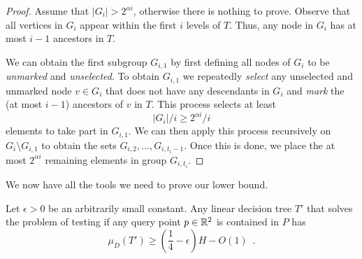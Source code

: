 \documentclass[charterfonts,lotsofwhite]{patmorin}
\begin{document}
\begin{proof}
Assume that $|G_i|> 2^{\alpha i}$, otherwise there is nothing to
prove.  Observe that all vertices in $G_i$ appear within the first $i$
levels of $T$.  Thus, any node in $G_i$ has at most $i-1$ ancestors in
$T$.  

We can obtain the first subgroup $G_{i,1}$ by first defining all nodes of
$G_i$ to be \emph{unmarked} and \emph{unselected}.  To obtain
$G_{i,1}$ we repeatedly \emph{select} any unselected and unmarked
node $v\in G_i$ that does not have any descendants in $G_i$ and
\emph{mark} the (at most $i-1$) ancestors of $v$ in $T$.  This
process selects at least
\[
   |G_i|/i \ge 2^{\alpha i}/i
\] 
elements to take part in $G_{i,1}$.  We can then apply this process
recursively on $G_i\setminus G_{i,1}$ to obtain the sets
$G_{i,2},\ldots,G_{i,t_i-1}$.  Once this is done, we place the at most
$2^{\alpha i}$ remaining elements in group $G_{i,t_i}$.
\end{proof}

We now have all the tools we need to prove our lower bound.

\begin{thm}
Let $\epsilon > 0$ be an arbitrarily small constant.
Any linear decision tree $T'$ that solves the problem of testing 
if any query point 
$p\in\mathbb{R}^2$ is contained in $P$ has
\[
   \mu_D(T') \ge \left(\frac{1}{4}-\epsilon\right)H - O(1) \enspace .
\]
\end{thm}
\end{document}
